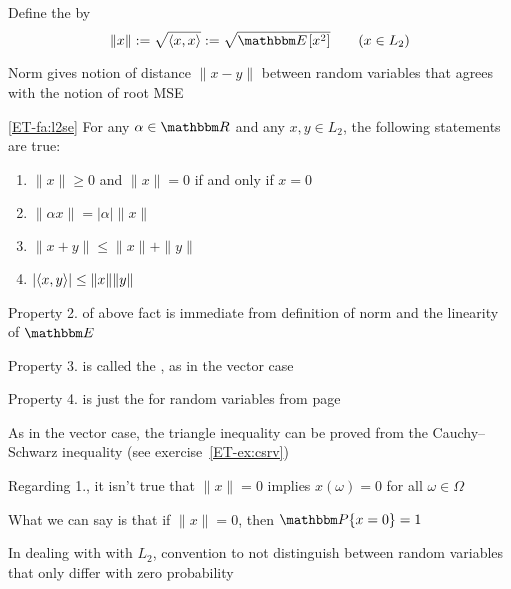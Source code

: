 \begin{frame}

    \vspace{2em}
    Define the  by
    \begin{equation*}
        \label{eq:rvnorm}
        \| x \| 
        := \sqrt{ \inner{x, x} } 
        := \sqrt{ \EE[x^2] } 
        \qquad (x \in L_2)
    \end{equation*}
    
    Norm gives notion of distance $\|x - y\|$ between random
    variables that agrees with the notion of root MSE
    
    \vspace{1em}
    \Fact\eqref{ET-fa:l2se}
    For any $\alpha \in \RR$ and any $x, y \in L_2$, the following 
    statements are true:
    \begin{enumerate}
        \item $\| x \| \geq 0$ and $\| x \| = 0$ if and only if
            $x = 0$
        \item $\| \alpha x \| = |\alpha| \| x \|$
        \item $\| x + y \| \leq  \| x \| + \| y \|$
        \item $| \! \left\langle{x, y}\right\rangle\!  | \leq  \| x \| \| y \|$
    \end{enumerate}
    
\end{frame}

\begin{frame}

    \vspace{2em}
    Property 2. of above fact is
    immediate from definition of norm and the linearity of $\EE$
    
    Property 3.
    is called the , as in the vector case
    
    Property
    4. is just the  for random variables from
    page~\pageref{ET-fa:csrv}
    
    As in the vector case, the
    triangle inequality can be proved from the Cauchy--Schwarz inequality (see exercise~\ref{ET-ex:csrv})
    
\end{frame}

\begin{frame}

    \vspace{2em}
    Regarding 1., it isn't true that $\| x \| = 0$ implies $x(\omega) = 0$ for all $\omega \in \Omega$
    
    What we can say is that if $\| x \| = 0$, then
    $\PP\{x =0\} =1$
    
    \vspace{1em}
    In dealing with  with $L_2$, convention to not distinguish between random variables that only differ with zero
    probability
    
\end{frame}

